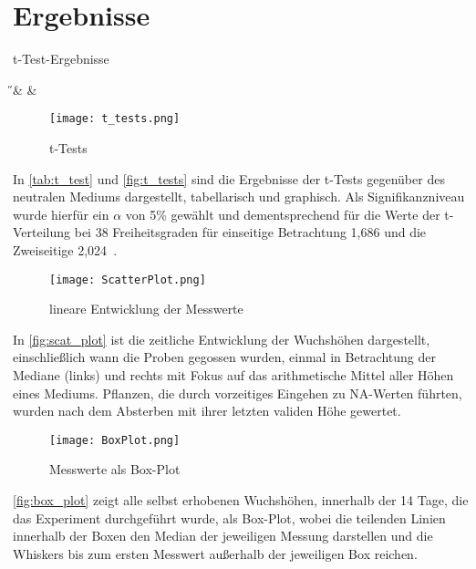 \section{Ergebnisse} %
    \label{sec:ergebnisse}
    \begin{table}[h]
        \centering
        \caption{t-Test-Ergebnisse}
        \label{tab:t_test}
        {\H & \pH & \NaCl}
    \end{table}

    \begin{figure}[h]
        \texttt{[image: t\_tests.png]}
        \caption{t-Tests}
        \label{fig:t_tests}
    \end{figure}
    In \autoref{tab:t_test} und \autoref{fig:t_tests} sind die Ergebnisse der t-Tests gegenüber des neutralen Mediums dargestellt, tabellarisch und graphisch. Als Signifikanzniveau wurde hierfür ein \( \alpha \) von 5\% gewählt und dementsprechend für die Werte der t-Verteilung bei 38 Freiheitsgraden für einseitige Betrachtung 1,686 und die Zweiseitige 2,024\ \cite[vgl.][]{web:t-values}.
    \newpage

    \begin{figure}[h]
        \centering
        \texttt{[image: ScatterPlot.png]}
        \caption{lineare Entwicklung der Messwerte}
        \label{fig:scat_plot}
    \end{figure}
    In \autoref{fig:scat_plot} ist die zeitliche Entwicklung der Wuchshöhen dargestellt, einschließlich wann die Proben gegossen wurden, einmal in Betrachtung der Mediane (links) und rechts mit Fokus auf das arithmetische Mittel aller Höhen eines Mediums. Pflanzen, die durch vorzeitiges Eingehen zu NA-Werten führten, wurden nach dem Absterben mit ihrer letzten validen Höhe gewertet.

    \begin{figure}[h]
        \centering
        \texttt{[image: BoxPlot.png]}
        \caption{Messwerte als Box-Plot}
        \label{fig:box_plot}
    \end{figure}
    \autoref{fig:box_plot} zeigt alle selbst erhobenen Wuchshöhen, innerhalb der 14 Tage, die das Experiment durchgeführt wurde, als Box-Plot, wobei die teilenden Linien innerhalb der Boxen den Median der jeweiligen Messung darstellen und die Whiskers bis zum ersten Messwert außerhalb der jeweiligen Box reichen.
    \newpage

